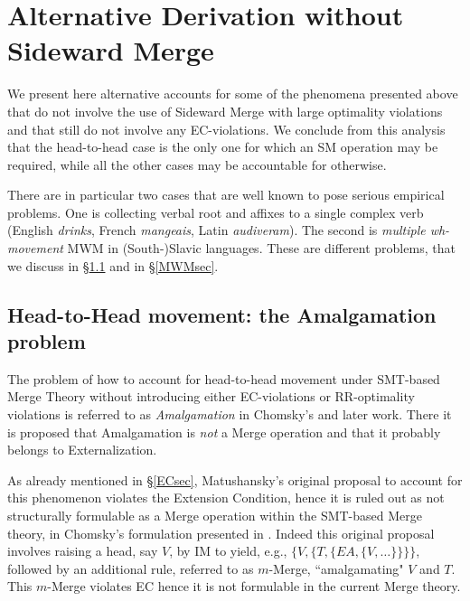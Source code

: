 \documentclass[12pt]{amsart}
\numberwithin{equation}{section}
\begin{document}
\section{Alternative Derivation without Sideward Merge}\label{ExtSec} 

 We present here alternative accounts for some of the phenomena presented above
 that do not involve the use of Sideward Merge with large optimality violations and that 
 still do not involve any EC-violations. We conclude from this analysis that the
 head-to-head case is the only one for which an SM operation may be required, while
 all the other cases may be accountable for otherwise. 
 
 \smallskip
 
 There are in particular two cases that are well known to pose serious 
 empirical problems. One is collecting verbal root and affixes to a single 
 complex verb (English {\em drinks}, French {\em mangeais}, Latin {\em audiveram}). 
 The second is {\em multiple wh-movement} MWM in (South-)Slavic languages. 
 These are different problems, that we discuss in \S \ref{amalgSec} and in \S \ref{MWMsec}. 
 
 \smallskip
 \subsection{Head-to-Head movement: the Amalgamation problem}  \label{amalgSec}

The problem of how to account for head-to-head movement 
under SMT-based Merge Theory without introducing either 
EC-violations or RR-optimality violations
is referred to as {\em Amalgamation} in Chomsky's \cite{ChomskyGK} 
and later work. There it is proposed that Amalgamation is {\em not} a
Merge operation and that it probably belongs to Externalization.

\smallskip

As already mentioned in \S \ref{ECsec}, Matushansky’s 
original proposal \cite{Matu} to account for this phenomenon
violates the Extension Condition, hence it is ruled out as
not structurally formulable as a Merge operation within the 
SMT-based Merge theory,  in Chomsky's formulation 
presented in \cite{ChomskyElements}. Indeed this original proposal 
involves raising a head, say $V$, by IM to yield, e.g., $\{V, \{T, \{EA, \{V, \ldots \} \} \} \}$, 
followed by an additional rule, referred to as $m$-Merge, ``amalgamating" $V$ and $T$.
This $m$-Merge violates EC hence it is not formulable in the current Merge theory.
\end{document}
